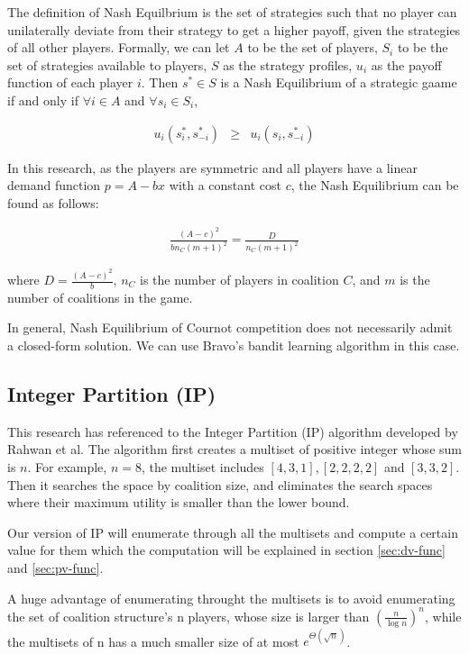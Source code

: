 \documentclass[sigconf,anonymous]{aamas}
\newcommand{\ykc}[1]{{\color{blue} #1}}
\begin{document}
The definition of Nash Equilbrium is the set of strategies such that no player can unilaterally deviate from their strategy to get a higher payoff, given the strategies of all other players. Formally, we can let $A$ to be the set of players, $S_i$ to be the set of strategies available to players, $S$ as the strategy profiles, $u_i$ as the payoff function of each player $i$. Then $s^*\in S$ is a Nash Equilibrium of a strategic gaame if and only if $\forall i \in A$ and $\forall s_i \in S_i$, 

\begin{eqnarray}
u_i(s^*_i, s_{-i}^*) & \geq & u_i(s_i, s_{-i}^*)
\end{eqnarray} 

In this research, as the players are symmetric and all players have a linear demand function $p = A - bx$ with a constant cost $c$, the Nash Equilibrium can be found as follows: 

\begin{eqnarray}
	\frac{(A-c)^2}{bn_C(m+1)^2} = \frac{D}{n_C(m+1)^2}
\end{eqnarray}

where $D = \frac{(A-c)^2}{b}$, $n_C$ is the number of players in coalition $C$, and $m$ is the number of coalitions in the game. 

\ykc{In general, Nash Equilibrium of Cournot competition does not necessarily admit a closed-form solution. We can use Bravo's bandit learning algorithm in this case.}

\subsection{Integer Partition (IP)}

This research has referenced to the Integer Partition (IP) algorithm developed by Rahwan et al. The algorithm first creates a multiset of positive integer whose sum is $n$. For example, $n=8$, the multiset includes $[4, 3, 1], [2, 2, 2, 2]$ and $[3, 3, 2]$. Then it searches the space by coalition size, and eliminates the search spaces where their maximum utility is smaller than the lower bound. 

Our version of IP will enumerate through all the multisets and compute a certain value for them which the computation will be explained in section \ref{sec:dv-func} and \ref{sec:pv-func}. 

A huge advantage of enumerating throught the multisets is to avoid enumerating the set of coalition structure's n players, whose size is larger than $(\frac{n}{\log n })^n$, while the multisets of n has a much smaller size of at most $e^{\Theta(\sqrt{n})}$. 
\end{document}
